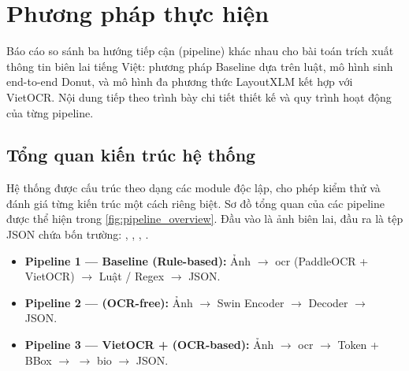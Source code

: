 \section{Phương pháp thực hiện}
\label{sec:methodology}

Báo cáo so sánh ba hướng tiếp cận (pipeline) khác nhau cho bài toán trích xuất thông tin biên lai tiếng Việt: phương pháp Baseline dựa trên luật, mô hình sinh end-to-end Donut, và mô hình đa phương thức LayoutXLM kết hợp với VietOCR. Nội dung tiếp theo trình bày chi tiết thiết kế và quy trình hoạt động của từng pipeline.

\subsection{Tổng quan kiến trúc hệ thống}
\label{subsec:system_overview}

Hệ thống được cấu trúc theo dạng các module độc lập, cho phép kiểm thử và đánh giá từng kiến trúc một cách riêng biệt. Sơ đồ tổng quan của các pipeline được thể hiện trong \cref{fig:pipeline_overview}.
Đầu vào là ảnh biên lai, đầu ra là tệp JSON chứa bốn trường:
, , , .

\begin{itemize}
  \item \textbf{Pipeline 1 — Baseline (Rule-based):}
    Ảnh $\rightarrow$ \gls{ocr} (PaddleOCR + VietOCR) $\rightarrow$
    Luật / Regex $\rightarrow$ JSON.

  \item \textbf{Pipeline 2 —  (OCR-free):}
    Ảnh $\rightarrow$ Swin Encoder $\rightarrow$  Decoder
    $\rightarrow$ JSON.

  \item \textbf{Pipeline 3 — VietOCR +  (OCR-based):}
    Ảnh $\rightarrow$ \gls{ocr} $\rightarrow$ Token + BBox $\rightarrow$
     $\rightarrow$ \gls{bio} $\rightarrow$ JSON.
\end{itemize}

